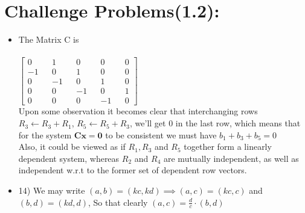 \documentclass{article}
\begin{document}
\section{Challenge Problems(1.2):}
\begin{itemize}
  \item The Matrix C is \\ \\
  $\begin{bmatrix}
    0 && 1 && 0 && 0 && 0 \\
    -1 && 0 && 1 && 0 && 0 \\
    0 && -1 && 0 && 1 && 0 \\
    0 && 0 && -1 && 0 && 1 \\
    0 && 0 && 0 && -1 && 0

  \end{bmatrix}$
  \\ Upon some observation it becomes clear that interchanging rows  $R_3 \leftarrow R_3 + R_1$, $R_5 \leftarrow R_5 + R_3$, we'll get 0 in the last row, which means that for the system $\mathbf{Cx = 0}$ to be consistent we must have $b_1 + b_3 + b_5 = 0$
  \\ Also, it could be viewed as if $R_1, R_3$ and $R_5$ together form a linearly dependent system, whereas $R_2$ and $R_4$ are mutually independent, as well as independent w.r.t to the former set of dependent row vectors.
  \item 14) We may write $(a,b) = (kc,kd) \implies (a,c) = (kc,c)$ and $(b,d) = (kd,d)$, So that clearly
  $(a,c) = \frac{d}{c} \cdot (b,d)$

\end{itemize}
\end{document}
